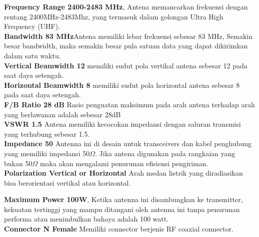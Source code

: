 \documentclass[a4paper,12pt]{article}
\begin{document}
\textbf{Frequency Range 2400-2483 MHz}, Antena memancarkan frekuensi dengan rentang 2400MHz-2483Mhz, yang termasuk dalam
golongan Ultra High Frequency (UHF).\\

\textbf{Bandwidth 83 MHz}Antena memiliki lebar frekuensi sebesar 83 MHz, Semakin besar bandwidth, maka semakin besar
pula satuan data yang dapat dikirimkan dalam satu waktu.\\

\textbf{Vertical Beamwidth 12} memiliki sudut pola vertikal antena sebesar 12 pada saat daya setengah.\\

\textbf{Horizontal Beamwidth 8} memiliki sudut pola horizontal antena sebesar 8 pada saat daya setengah.\\

\textbf{F/B Ratio 28 dB} Rasio penguatan maksimum pada arah antena terhadap arah yang berlawanan adalah sebesar 28dB\\

\textbf{VSWR 1.5} Antena memiliki kecocokan impedansi dengan saluran transmisi yang terhubung sebesar 1.5.\\

\textbf{Impedance 50} Antenna ini di desain untuk transceivers dan kabel penghubung yang memiliki impedansi 50$\Omega$. Jika antena digunakan pada rangkaian
yang bukan 50$\Omega$ maka akan mengalami penurunan efisiensi pengiriman.\\

\textbf{Polarization Vertical or Horizontal} Arah medan listrik yang diradiasikan bisa berorientasi vertikal atau
horizontal.

\textbf{Maximum Power 100W}, Ketika antenna ini disambungkan ke transmitter, kekuatan tertinggi yang mampu ditangani oleh antenna ini tanpa
penurunan performa atau menimbulkan bahaya adalah 100 watt.\\

\textbf{Connector N Female} Memiliki connector berjenis RF coaxial connector.
\end{document}

